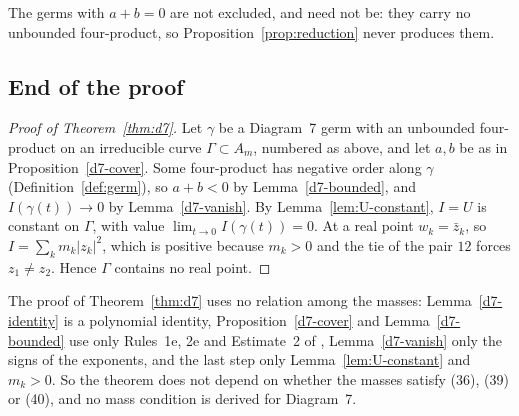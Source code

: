 \begin{remark}\label{d7-balanced}
The germs with $a+b=0$ are not excluded, and need not be: they carry no unbounded four-product,
so Proposition~\ref{prop:reduction} never produces them.
\end{remark}

\subsection{End of the proof}

\begin{proof}[Proof of Theorem~\ref{thm:d7}]
Let $\gamma$ be a Diagram~7 germ with an unbounded four-product on an irreducible curve
$\Gamma\subset A_m$, numbered as above, and let $a,b$ be as in Proposition~\ref{d7-cover}.  Some
four-product has negative order along $\gamma$ (Definition~\ref{def:germ}), so $a+b<0$ by
Lemma~\ref{d7-bounded}, and $I(\gamma(t))\to0$ by Lemma~\ref{d7-vanish}.  By
Lemma~\ref{lem:U-constant}, $I=U$ is constant on $\Gamma$, with value
$\lim_{t\to0}I(\gamma(t))=0$.  At a real point $w_k=\bar z_k$, so $I=\sum_km_k|z_k|^2$,
which is positive because $m_k>0$ and the tie of the pair $12$ forces $z_1\ne z_2$.  Hence
$\Gamma$ contains no real point.
\end{proof}

\begin{remark}\label{d7-masses}
The proof of Theorem~\ref{thm:d7} uses no relation among the masses: Lemma~\ref{d7-identity} is a
polynomial identity, Proposition~\ref{d7-cover} and Lemma~\ref{d7-bounded} use only Rules~1e,
2e and Estimate~2 of \cite[\S3]{AK}, Lemma~\ref{d7-vanish} only the signs of the exponents, and
the last step only Lemma~\ref{lem:U-constant} and $m_k>0$.  So the theorem does not depend on
whether the masses satisfy (36), (39) or (40), and no mass condition is derived for Diagram~7.
\end{remark}
